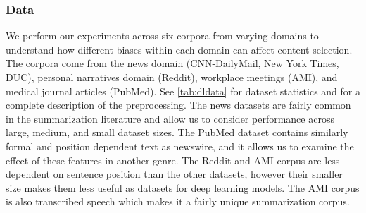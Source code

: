 %
%
%
%
%
\subsubsection{Data}

We perform our experiments across six corpora from varying domains to 
understand how different biases within each domain can affect content 
selection. The corpora come from the news domain
(CNN-DailyMail, New York Times, DUC), personal narratives domain (Reddit),
workplace meetings (AMI), and medical journal articles (PubMed). See 
\autoref{tab:dldata} for dataset statistics and \cite{kedzie2018deep} for a
complete description of the preprocessing.
The news datasets are fairly common in the summarization literature and
allow us to consider performance across large, medium, and small dataset
sizes. The PubMed dataset contains similarly formal and position dependent
text as newswire, and it allows us to examine the effect of these features
in another genre.
The Reddit and AMI corpus are less dependent on sentence position
than the
other datasets, however their smaller size makes them less useful as 
datasets for deep learning models. The AMI corpus is also transcribed speech
which makes it a fairly unique summarization corpus.

